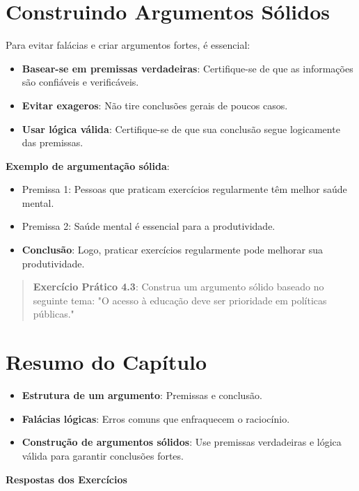 \documentclass[a4paper,12pt]{book}
\begin{document}
\section{Construindo Argumentos Sólidos}
Para evitar falácias e criar argumentos fortes, é essencial:

\begin{itemize}
    \item \textbf{Basear-se em premissas verdadeiras}: Certifique-se de que as informações são confiáveis e verificáveis.
    \item \textbf{Evitar exageros}: Não tire conclusões gerais de poucos casos.
    \item \textbf{Usar lógica válida}: Certifique-se de que sua conclusão segue logicamente das premissas.
\end{itemize}

\textbf{Exemplo de argumentação sólida}:

\begin{itemize}
    \item Premissa 1: Pessoas que praticam exercícios regularmente têm melhor saúde mental.
    \item Premissa 2: Saúde mental é essencial para a produtividade.
    \item \textbf{Conclusão}: Logo, praticar exercícios regularmente pode melhorar sua produtividade.
\end{itemize}

\begin{quote}
\textbf{Exercício Prático 4.3}: Construa um argumento sólido baseado no seguinte tema: "O acesso à educação deve ser prioridade em políticas públicas."
\end{quote}

\section*{Resumo do Capítulo}
\begin{itemize}
    \item \textbf{Estrutura de um argumento}: Premissas e conclusão.
    \item \textbf{Falácias lógicas}: Erros comuns que enfraquecem o raciocínio.
    \item \textbf{Construção de argumentos sólidos}: Use premissas verdadeiras e lógica válida para garantir conclusões fortes.
\end{itemize}

\textbf{Respostas dos Exercícios}
\end{document}
